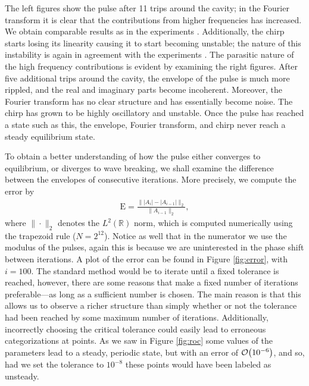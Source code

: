 \documentclass[10pt,twocolumn,a4paper]{article}
\let\originalleft\left
\let\originalright\right
\renewcommand{\left}{\mathopen{}\mathclose\bgroup\originalleft}
\renewcommand{\right}{\aftergroup\egroup\originalright}
\providecommand{\bigO}[1]{\ensuremath{\mathop{}\mathopen{}\mathcal{O}\mathopen{}\left(#1\right)}}
\begin{document}
The left figures show the pulse after 11 trips around the cavity; in the Fourier transform it is clear that the contributions from higher frequencies has increased. We obtain comparable results as in the experiments \cite{anderson, rothenberg}. Additionally, the chirp starts losing its linearity causing it to start becoming unstable; the nature of this instability is again in agreement with the experiments \cite{anderson, rothenberg}. The parasitic nature of the high frequency contributions is evident by examining the right figures. After five additional trips around the cavity, the envelope of the pulse is much more rippled, and the real and imaginary parts become incoherent. Moreover, the Fourier transform has no clear structure and has essentially become noise. The chirp has grown to be highly oscillatory and unstable. Once the pulse has reached a state such as this, the envelope, Fourier transform, and chirp never reach a steady equilibrium state.




To obtain a better understanding of how the pulse either converges to equilibrium, or diverges to wave breaking, we shall examine the difference between the envelopes of consecutive iterations. More precisely, we compute the error by
\begin{align}
\textrm{E} = \frac{\| |A_i| - |A_{i-1}| \|_2}{\| A_{i-1} \|_2},
\label{eq:error}
\end{align}
where $\| \cdot \|_2$ denotes the $L^2(\mathbb{R})$ norm, which is computed numerically using the trapezoid rule ($N = 2^{12}$). Notice as well that in the numerator we use the modulus of the pulses, again this is because we are uninterested in the phase shift between iterations. A plot of the error can be found in Figure \ref{fig:error}, with $i = 100$. The standard method would be to iterate until a fixed tolerance is reached, however, there are some reasons that make a fixed number of iterations preferable---as long as a sufficient number is chosen. The main reason is that this allows us to observe a richer structure than simply whether or not the tolerance had been reached by some maximum number of iterations. Additionally, incorrectly choosing the critical tolerance could easily lead to erroneous categorizations at points. As we saw in Figure \ref{fig:roc} some values of the parameters lead to a steady, periodic state, but with an error of $\bigO{10^{-6}}$, and so, had we set the tolerance to $10^{-8}$ these points would have been labeled as unsteady. \\
\end{document}
